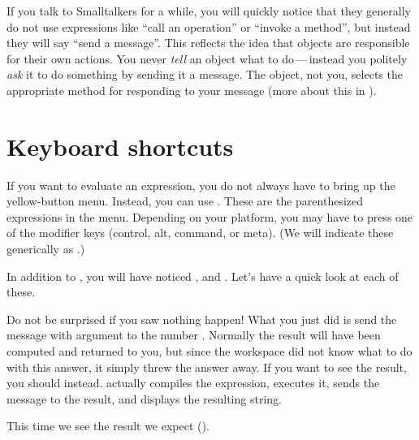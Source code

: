 \documentclass[a4paper,10pt,twoside]{book}
\begin{document}
If you talk to Smalltalkers for a while, you will quickly notice that they generally do not use expressions like ``call an operation'' or ``invoke a method'', but instead they will say ``send a message''.
This reflects the idea that objects are responsible for their own actions. 
You never \emph{tell} an object what to do\,---\,instead you politely \emph{ask} it to do something by sending it a message. 
The object, not you, selects the appropriate method for responding to your message (more about this in ).


\section{Keyboard shortcuts}

If you want  to evaluate an expression, you do not always have to bring up the yellow-button menu. Instead, you can use . These are the parenthesized expressions in the menu.  Depending on your platform, you may have to press one of the modifier keys (control, alt, command, or meta).
(We will indicate these generically as .)


In addition to , you will have noticed ,  and . Let's have a quick look at each of these.


Do not be surprised if you saw nothing happen! What you just did is send the message \ct{+} with argument  to the number . Normally the result  will have been computed and returned to you, but since the workspace did not know what to do with this answer, it simply threw the answer away.  If you want to see the result, you should  instead.  actually compiles the expression, executes it, sends the message  to the result, and displays the resulting string.

This time we see the result we expect ().
\end{document}
